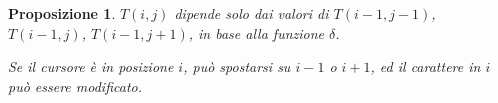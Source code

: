 \documentclass[a4paper,10pt,oneside]{article}
\theoremstyle{break}
\newtheorem{prop}{Proposizione}[subsection]
\begin{document}
\begin{mdframed}
\begin{prop}
\label{treuno}
 $T(i, j)$ dipende solo dai valori di $T(i-1, j-1)$, $T(i-1, j)$, $T(i-1, j + 1)$, in base alla funzione $\delta$.

 \dotfill

 \begin{center}


 \end{center}

 Se il cursore è in posizione $i$, può spostarsi su $i-1$ o $i+1$, ed il carattere in $i$ può essere modificato.

\end{prop}
\end{mdframed}
\newpage
\end{document}
